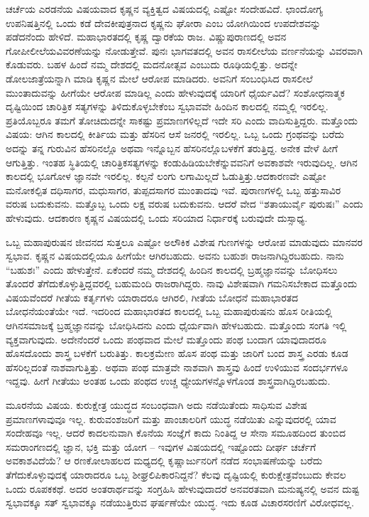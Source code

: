ಚರ್ಚೆಯ ಎರಡನೆಯ ವಿಷಯವಾದ ಕೃಷ್ಣನ ವ್ಯಕ್ತಿತ್ವದ ವಿಷಯದಲ್ಲಿ ಎಷ್ಟೋ ಸಂದೇಹವಿದೆ. ಛಾಂದೋಗ್ಯ ಉಪನಿಷತ್ತಿನಲ್ಲಿ ಒಂದು ಕಡೆ ದೇವಕೀಪುತ್ರನಾದ ಕೃಷ್ಣನು ಘೋರಾ ಎಂಬ ಯೋಗಿಯಿಂದ ಉಪದೇಶವನ್ನು ಪಡೆದನೆಂದು ಹೇಳಿದೆ. ಮಹಾ\-ಭಾರತದಲ್ಲಿ ಕೃಷ್ಣ ದ್ವಾರಕೆಯ ರಾಜ. ವಿಷ್ಣುಪುರಾಣದಲ್ಲಿ ಅವನ ಗೋಪೀಲೀಲೆಯ\break ವಿವರಣೆಯನ್ನು ನೋಡುತ್ತೇವೆ. ಪುನಃ ಭಾಗವತದಲ್ಲಿ ಅವನ ರಾಸಲೀಲೆಯ ವರ್ಣನೆ\-ಯನ್ನು ವಿವರವಾಗಿ ಕೊಡುವರು. ಬಹಳ ಹಿಂದೆ ನಮ್ಮ ದೇಶದಲ್ಲಿ ಮದನೋತ್ಸವ ಎಂಬುದು ರೂಢಿಯಲ್ಲಿತ್ತು. ಅದನ್ನೇ ಡೋಲಜಾತ್ರೆಯನ್ನಾಗಿ ಮಾಡಿ ಕೃಷ್ಣನ ಮೇಲೆ ಆರೋಪ ಮಾಡಿದರು. ಅವನಿಗೆ ಸಂಬಂಧಿಸಿದ ರಾಸಲೀಲೆ ಮುಂತಾದುವನ್ನು ಹೀಗೆಯೇ ಆರೋಪ ಮಾಡಿಲ್ಲ ಎಂದು ಹೇಳುವುದಕ್ಕೆ ಯಾರಿಗೆ ಧೈರ್ಯವಿದೆ? ಸಂಶೋಧನಾತ್ಮಕ ದೃಷ್ಟಿಯಿಂದ ಚಾರಿತ್ರಿಕ ಸತ್ಯಗಳನ್ನು ತಿಳಿದುಕೊಳ್ಳಬೇಕೆಂಬ ಸ್ವಭಾವವೇ ಹಿಂದಿನ ಕಾಲದಲ್ಲಿ ನಮ್ಮಲ್ಲಿ ಇರಲಿಲ್ಲ. ಪ್ರತಿಯೊಬ್ಬರೂ ತಮಗೆ ತೋಚಿದುದನ್ನೇ ಸಾಕಷ್ಟು ಪ್ರಮಾಣಗಳಿಲ್ಲದೆ ಇದೇ ಸರಿ ಎಂದು ವಾದಿಸುತ್ತಿದ್ದರು. ಮತ್ತೊಂದು ವಿಷಯ: ಆಗಿನ ಕಾಲದಲ್ಲಿ ಕೀರ್ತಿಯ ಮತ್ತು ಹೆಸರಿನ ಆಸೆ ಜನರಲ್ಲಿ ಇರಲಿಲ್ಲ. ಒಬ್ಬ ಒಂದು ಗ್ರಂಥವನ್ನು ಬರೆದು ಅದನ್ನು ತನ್ನ ಗುರುವಿನ ಹೆಸರಿನಲ್ಲೊ ಅಥವಾ ಇನ್ನೊಬ್ಬನ ಹೆಸರಿನಲ್ಲೊ\break ಬಳಕೆಗೆ ತರುತ್ತಿದ್ದ. ಅನೇಕ ವೇಳೆ ಹೀಗೆ ಆಗುತ್ತಿತ್ತು. ಇಂತಹ ಸ್ಥಿತಿಯಲ್ಲಿ ಚಾರಿತ್ರಿಕ\break ಸತ್ಯಗಳನ್ನು ಕಂಡುಹಿಡಿಯಬೇಕೆನ್ನುವವನಿಗೆ ಅವಕಾಶವೇ ಇರುವುದಿಲ್ಲ. ಆಗಿನ ಕಾಲದಲ್ಲಿ ಭೂಗೋಳ ಜ್ಞಾನವೇ ಇರಲಿಲ್ಲ. ಕಲ್ಪನೆ ಲಂಗು ಲಗಾಮಿಲ್ಲದೆ ಓಡುತ್ತಿತ್ತು.\break ಆದಕಾರಣವೇ ಎಷ್ಟೋ ಮನೋಕಲ್ಪಿತ ದಧಿಸಾಗರ, ಮಧುಸಾಗರ, ತುಪ್ಪದಸಾಗರ ಮುಂತಾದವು ಇವೆ. ಪುರಾಣಗಳಲ್ಲಿ ಒಬ್ಬ ಹತ್ತುಸಾವಿರ ವರುಷ ಬದುಕುವನು. ಮತ್ತೊಬ್ಬ ಒಂದು ಲಕ್ಷ ವರುಷ ಬದುಕುವನು. ಆದರೆ ವೇದ “ಶತಾಯುರ್ವೈ ಪುರುಷಃ” ಎಂದು ಹೇಳುವುದು. ಆದಕಾರಣ ಕೃಷ್ಣನ ವಿಷಯದಲ್ಲಿ ಒಂದು ಸರಿಯಾದ ನಿರ್ಧಾರಕ್ಕೆ ಬರುವುದೇ ದುಸ್ಸಾಧ್ಯ.

ಒಬ್ಬ ಮಹಾಪುರುಷನ ಜೀವನದ ಸುತ್ತಲೂ ಎಷ್ಟೋ ಅಲೌಕಿಕ ವಿಶೇಷ ಗುಣಗಳನ್ನು ಆರೋಪ ಮಾಡುವುದು ಮಾನವರ ಸ್ವಭಾವ. ಕೃಷ್ಣನ ವಿಷಯದಲ್ಲಿಯೂ ಹೀಗೆಯೇ ಆಗಿರಬಹುದು. ಅವನು ಬಹುಶಃ ರಾಜನಾಗಿದ್ದಿರಬಹುದು. ನಾನು “ಬಹುಶಃ” ಎಂದು ಹೇಳುತ್ತೇನೆ. ಏಕೆಂದರೆ ನಮ್ಮ ದೇಶದಲ್ಲಿ ಹಿಂದಿನ ಕಾಲದಲ್ಲಿ ಬ್ರಹ್ಮಜ್ಞಾನವನ್ನು ಬೋಧಿಸಲು ತೊಂದರೆ ತೆಗೆದುಕೊಳ್ಳುತ್ತಿದ್ದವರಲ್ಲಿ ಬಹುಮಂದಿ ರಾಜರಾಗಿದ್ದರು. ನಾವು ವಿಶೇಷವಾಗಿ ಗಮನಿಸಬೇಕಾದ ಮತ್ತೊಂದು ವಿಷಯವೆಂದರೆ ಗೀತೆಯ ಕರ್ತೃಗಳು ಯಾರಾದರೂ ಆಗಿರಲಿ, ಗೀತೆಯ ಬೋಧನೆ ಮಹಾಭಾರತದ ಬೋಧನೆಯಂತೆಯೇ ಇದೆ. ಇದರಿಂದ ಮಹಾಭಾರತದ ಕಾಲದಲ್ಲಿ ಒಬ್ಬ ಮಹಾಪುರುಷನು ಹೊಸ ರೀತಿಯಲ್ಲಿ ಆಗಿನ\break ಸಮಾಜಕ್ಕೆ ಬ್ರಹ್ಮಜ್ಞಾನವನ್ನು ಬೋಧಿಸಿದನು ಎಂದು ಧೈರ್ಯವಾಗಿ ಹೇಳಬಹುದು. ಮತ್ತೊಂದು ಸಂಗತಿ ಇಲ್ಲಿ ವ್ಯಕ್ತವಾಗುವುದು. ಅದೇನೆಂದರೆ ಒಂದು ಪಂಥವಾದ ಮೇಲೆ ಮತ್ತೊಂದು ಪಂಥ ಬಂದಾಗ ಯಾವುದಾದರೂ ಹೊಸದೊಂದು ಶಾಸ್ತ್ರ ಬಳಕೆಗೆ ಬರುತಿತ್ತು. ಕಾಲಕ್ರಮೇಣ ಹೊಸ ಪಂಥ ಮತ್ತು ಜಾರಿಗೆ ಬಂದ ಶಾಸ್ತ್ರ ಎರಡು ಕೂಡ ಹೆಸರಿಲ್ಲದಂತೆ ನಾಶವಾಗುತ್ತಿತ್ತು. ಅಥವಾ ಪಂಥ ಮಾತ್ರವೇ ನಾಶವಾಗಿ ಶಾಸ್ತ್ರವು ಹಿಂದೆ ಉಳಿಯುವ ಸಂದರ್ಭಗಳೂ ಇದ್ದವು. ಹೀಗೆ ಗೀತೆಯು ಅಂತಹ ಒಂದು ಪಂಥದ ಉಚ್ಚ ಧ್ಯೇಯಗಳನ್ನೊಳಗೊಂಡ ಶಾಸ್ತ್ರವಾಗಿದ್ದಿರಬಹುದು.

ಮೂರನೆಯ ವಿಷಯ. ಕುರುಕ್ಷೇತ್ರ ಯುದ್ಧದ ಸಂಬಂಧವಾಗಿ ಅದು ನಡೆಯಿತೆಂದು ಸಾಧಿಸುವ ವಿಶೇಷ ಪ್ರಮಾಣಗಳಾವುವೂ ಇಲ್ಲ. ಕುರುವಂಶಜರಿಗೆ ಮತ್ತು ಪಾಂಚಾಲರಿಗೆ ಯುದ್ಧ ನಡೆಯಿತು ಎನ್ನುವುದರಲ್ಲಿ ಯಾವ ಸಂದೇಹವೂ ಇಲ್ಲ. ಆದರೆ ಕಾದಲನುವಾಗಿ ಕೊನೆಯ ಸಂಜ್ಞೆಗೆ ಕಾದು ನಿಂತಿದ್ದ ಆ ಸೇನಾ ಸಮೂಹದಿಂದ ತುಂಬಿದ ಸಮರಾಂಗಣದಲ್ಲಿ ಜ್ಞಾನ, ಭಕ್ತಿ ಮತ್ತು ಯೋಗ – ಇವುಗಳ ವಿಷಯದಲ್ಲಿ ಇಷ್ಟೊಂದು ದೀರ್ಘ ಚರ್ಚೆಗೆ ಅವಕಾಶವಿದೆಯೆ? ಆ ರಣಕೋಲಾಹಲದ ಮಧ್ಯದಲ್ಲಿ ಕೃಷ್ಣಾರ್ಜುನರಿಗೆ ನಡೆದ ಸಂಭಾಷಣೆಯನ್ನು ಬರೆದು ತೆಗೆದುಕೊಳ್ಳುವುದಕ್ಕೆ ಯಾರಾದರೂ ಒಬ್ಬ ಶೀಘ್ರಲಿಪಿಕಾರನಿದ್ದನೆ? ಕೆಲವು ದೃಷ್ಟಿಯಲ್ಲಿ ಕುರುಕ್ಷೇತ್ರವೆಂಬುದು ಕೇವಲ ಒಂದು ರೂಪಕಕಥೆ. ಅದರ ಅಂತರಾರ್ಥವನ್ನು ಸಂಗ್ರಹಿಸಿ ಹೇಳುವುದಾದರೆ ಅನವರತವಾಗಿ ಮನುಷ್ಯನಲ್ಲಿ ಅವನ ದುಷ್ಟ ಸ್ವಭಾವಕ್ಕೂ ಸತ್​ ಸ್ವಭಾವಕ್ಕೂ ನಡೆಯುತ್ತಿರುವ ಘರ್ಷಣೆಯೇ ಯುದ್ಧ. ಇದು ಕೂಡ ವಿಚಾರಸರಣಿಗೆ ವಿರೋಧವಲ್ಲ.

